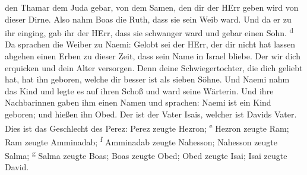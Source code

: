 den Thamar dem Juda gebar, von dem Samen, den dir der HErr geben wird
von dieser Dirne.  Also nahm Boas die Ruth, dass sie sein
Weib ward. Und da er zu ihr einging, gab ihr der HErr, dass sie
schwanger ward und gebar einen Sohn. \textsuperscript{d} 
Da sprachen die Weiber zu Naemi: Gelobt sei der HErr, der dir nicht hat
lassen abgehen einen Erben zu dieser Zeit, dass sein Name in Israel
bliebe.  Der wir dich erquicken und dein Alter versorgen.
Denn deine Schwiegertochter, die dich geliebt hat, hat ihn geboren,
welche dir besser ist als sieben Söhne.  Und Naemi nahm
das Kind und legte es auf ihren Schoß und ward seine Wärterin.
 Und ihre Nachbarinnen gaben ihm einen Namen und
sprachen: Naemi ist ein Kind geboren; und hießen ihn Obed. Der ist der
Vater Isais, welcher ist Davids Vater.  Dies ist das
Geschlecht des Perez: Perez zeugte Hezron; \textsuperscript{e}
 Hezron zeugte Ram; Ram zeugte Amminadab;
\textsuperscript{f}  Amminadab zeugte Nahesson; Nahesson
zeugte Salma; \textsuperscript{g}  Salma zeugte Boas;
Boas zeugte Obed;  Obed zeugte Isai; Isai zeugte David.

